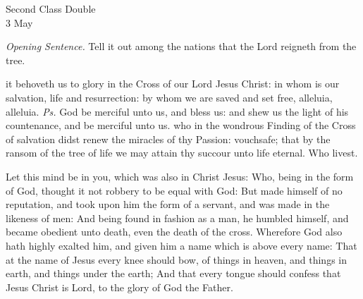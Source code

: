 \begin{inhead}
    {Second Class Double\\
3 May}
\end{inhead}
\par\noindent
\textit{Opening Sentence.} Tell it out among the nations that the Lord reigneth from the tree.\par

\introit
{} it behoveth us to glory in the Cross of our Lord Jesus Christ: in whom is our salvation, life and resurrection: by whom we are saved and set free, alleluia, alleluia. \textit{Ps.} God be merciful unto us, and bless us: and shew us the light of his countenance, and be merciful unto us.
\collect
{} who in the wondrous Finding of the Cross of salvation didst renew the miracles of thy Passion: vouchsafe; that by the ransom of the tree of life we may attain thy succour unto life eternal. Who livest.

 Let this mind be in you, which was also in Christ Jesus: Who, being in the form of God, thought it not robbery to be equal with God: But made himself of no reputation, and took upon him the form of a servant, and was made in the likeness of men: And being found in fashion as a man, he humbled himself, and became obedient unto death, even the death of the cross. Wherefore God also hath highly exalted him, and given him a name which is above every name: That at the name of Jesus every knee should bow, of things in heaven, and things in earth, and things under the earth; And that every tongue should confess that Jesus Christ is Lord, to the glory of God the Father.


